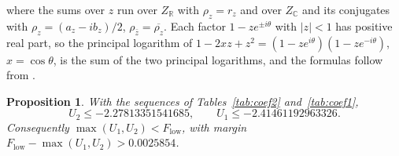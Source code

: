 \documentclass[11pt]{article}
\newtheorem{proposition}[theorem]{Proposition}
\theoremstyle{definition}
\begin{document}
where the sums over $z$ run over $Z_{\mathbb R}$ with $\rho_z=r_z$ and over $Z_{\mathbb C}$ and its conjugates with $\rho_z=(a_z-ib_z)/2$, $\rho_{\bar z}=\overline{\rho_z}$. Each factor $1-ze^{\pm i\theta}$ with $|z|<1$ has positive real part, so the principal logarithm of $1-2xz+z^2=(1-ze^{i\theta})(1-ze^{-i\theta})$, $x=\cos\theta$, is the sum of the two principal logarithms, and the formulas follow from \cite[Eq.~(82)]{OAI}.

\begin{proposition}\label{prop:c4}
With the sequences of Tables~\ref{tab:coef2} and~\ref{tab:coef1},
\[
U_2\le-2.27813351541685,\qquad U_1\le-2.41461192963326 .
\]
Consequently $\max(U_1,U_2)<F_{\mathrm{low}}$, with margin $F_{\mathrm{low}}-\max(U_1,U_2)>0.0025854$.
\end{proposition}
\end{document}
